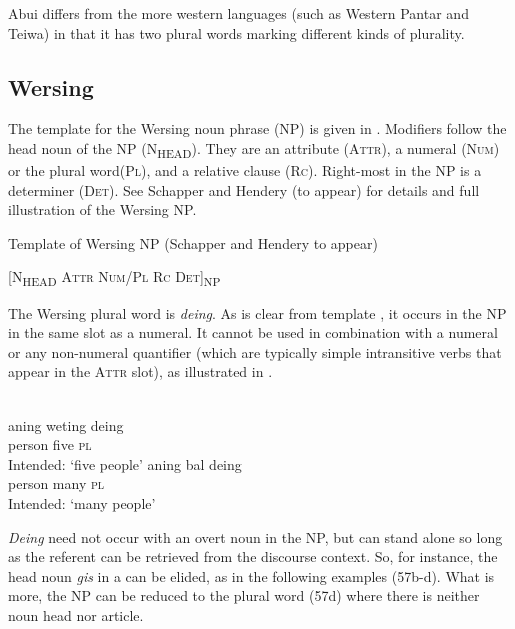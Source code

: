 Abui differs from the more western languages (such as Western Pantar and Teiwa) in that it has two plural words marking different kinds of plurality.

\subsection{Wersing} %
\label{sec:9:3.5}
The template for the Wersing noun phrase (NP) is given in . Modifiers follow the head noun of the NP (\textsc{N}\textsubscript{\MakeUppercase{head}}). They are an attribute (\textsc{Attr}), a numeral (\textsc{Num}) or the plural word\textsc{(Pl),} and a relative clause (\textsc{Rc).} \textsc{R}ight-most in the NP is a determiner (\textsc{Det}). See Schapper and Hendery (to appear) for details and full illustration of the Wersing NP.

\ea%
\label{ex:9:55}
 Template of Wersing NP (Schapper and Hendery to appear)

  [\textsc{N}\textsubscript{\MakeUppercase{head } }\textsc{Attr Num/Pl  Rc  Det]}\textsc{\textsubscript{NP}}
\z


The Wersing plural word is \textit{deing}. As is clear from template , it occurs in the NP in the same slot as a numeral. It cannot be used in combination with a numeral or any non-numeral quantifier (which are typically simple intransitive verbs that appear in the \textsc{Attr} slot), as illustrated in .


\ea%
\label{ex:9:56}
 \\
\ea
\gll *aning    weting deing \\
    person five \textsc{pl} \\
 \glt Intended: `five people'
\ex
\gll *aning bal {deing}\\
   person many   \textsc{pl} \\
\glt  Intended: `many people'
\z
\z






\textit{Deing} need not occur with an overt noun in the NP, but can stand alone so long as the referent can be retrieved from the discourse context. So, for instance, the head noun \textit{gis} in a can be elided, as in the following examples (57b-d). What is more, the NP can be reduced to the plural word (57d) where there is neither noun head nor article.


